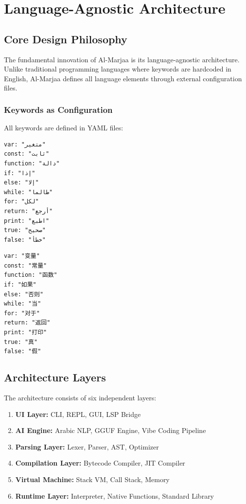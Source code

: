 \documentclass[11pt,a4paper]{article}
\begin{document}
\section{Language-Agnostic Architecture}
\label{sec:architecture}

\subsection{Core Design Philosophy}

The fundamental innovation of Al-Marjaa is its language-agnostic architecture. Unlike traditional programming languages where keywords are hardcoded in English, Al-Marjaa defines all language elements through external configuration files.

\subsubsection{Keywords as Configuration}

All keywords are defined in YAML files:

\begin{lstlisting}[language={},title=keywords\_ar.yaml (Arabic)]
var: "متغير"
const: "ثابت"
function: "دالة"
if: "إذا"
else: "إلا"
while: "طالما"
for: "لكل"
return: "أرجع"
print: "اطبع"
true: "صحيح"
false: "خطأ"
\end{lstlisting}

\begin{lstlisting}[language={},title=keywords\_zh.yaml (Chinese)]
var: "变量"
const: "常量"
function: "函数"
if: "如果"
else: "否则"
while: "当"
for: "对于"
return: "返回"
print: "打印"
true: "真"
false: "假"
\end{lstlisting}

\subsection{Architecture Layers}

The architecture consists of six independent layers:

\begin{enumerate}
    \item \textbf{UI Layer:} CLI, REPL, GUI, LSP Bridge
    \item \textbf{AI Engine:} Arabic NLP, GGUF Engine, Vibe Coding Pipeline
    \item \textbf{Parsing Layer:} Lexer, Parser, AST, Optimizer
    \item \textbf{Compilation Layer:} Bytecode Compiler, JIT Compiler
    \item \textbf{Virtual Machine:} Stack VM, Call Stack, Memory
    \item \textbf{Runtime Layer:} Interpreter, Native Functions, Standard Library
\end{enumerate}
\end{document}
